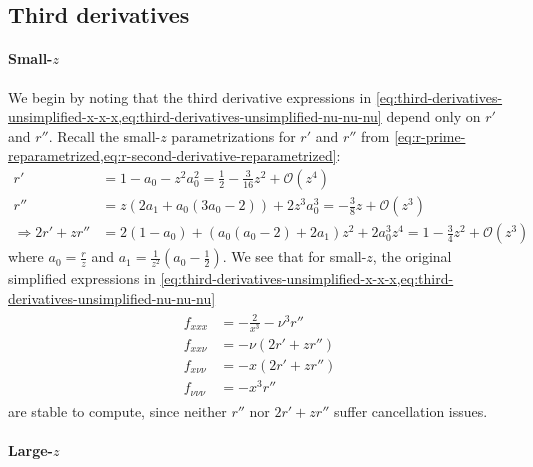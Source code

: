 \documentclass{article}
\begin{document}
\subsection{Third derivatives}\label{sec:rician-third-derivatives}

\paragraph{Small-$z$}

We begin by noting that the third derivative expressions in \cref{eq:third-derivatives-unsimplified-x-x-x,eq:third-derivatives-unsimplified-nu-nu-nu} depend only on $r'$ and $r''$.
Recall the small-$z$ parametrizations for $r'$ and $r''$ from \cref{eq:r-prime-reparametrized,eq:r-second-derivative-reparametrized}:
%
\begin{align}
  r'                      & = 1 - a_0 - z^2 a_0^2 = \frac{1}{2} - \frac{3}{16}z^2 + \mathcal{O}(z^4)                          \\
  r''                     & = z (2a_1 + a_0 (3 a_0 - 2)) + 2 z^3 a_0^3 = -\frac{3}{8}z + \mathcal{O}(z^3)                     \\
  \Rightarrow 2r' + z r'' & = 2 (1 - a_0) + (a_0 (a_0 - 2) + 2 a_1) z^2 + 2 a_0^3 z^4 = 1 - \frac{3}{4}z^2 + \mathcal{O}(z^3)
\end{align}
%
where $a_0 = \frac{r}{z}$ and $a_1 = \frac{1}{z^2} (a_0 - \frac{1}{2})$.
We see that for small-$z$, the original simplified expressions in \cref{eq:third-derivatives-unsimplified-x-x-x,eq:third-derivatives-unsimplified-nu-nu-nu}
%
\begin{align}
  \boxed{
    \begin{aligned}
      f_{xxx}       & = -\frac{2}{x^3} - \nu^3 r'' \\
      f_{xx\nu}     & = -\nu(2r' + z r'')          \\
      f_{x\nu\nu}   & = -x(2r' + z r'')            \\
      f_{\nu\nu\nu} & = -x^3 r''
    \end{aligned}
  }
\end{align}
%
are stable to compute, since neither $r''$ nor $2r' + z r''$ suffer cancellation issues.

\paragraph{Large-$z$}
\end{document}
